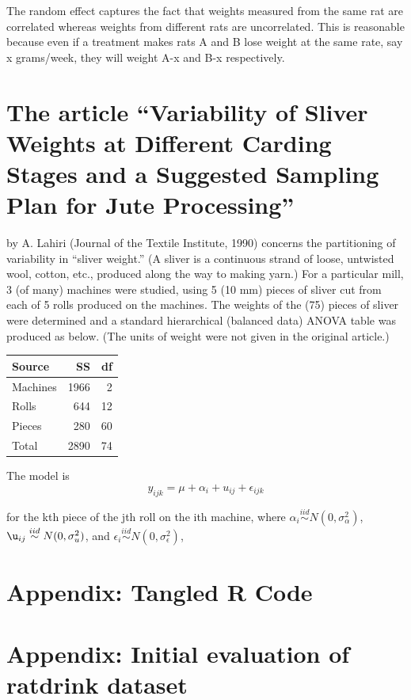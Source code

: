 \documentclass[11pt]{article}
\begin{document}
The random effect captures the fact that weights measured from the
same rat are correlated whereas weights from different rats are
uncorrelated. This is reasonable because even if a treatment makes
rats A and B lose weight at the same rate, say x grams/week, they
will weight A-x and B-x respectively.
\section{The article “Variability of Sliver Weights at Different Carding Stages and a Suggested Sampling Plan for Jute Processing”}
\label{sec-2}

by A. Lahiri (Journal of the Textile Institute, 1990) concerns the 
partitioning
of variability in “sliver weight.” (A sliver is a continuous strand
of loose, untwisted wool, cotton,
etc., produced along the way to making yarn.) For a particular mill, 
3 (of many) machines were
studied, using 5 (10 mm) pieces of sliver cut from each of 5 rolls produced on the machines. The
weights of the (75) pieces of sliver were determined and a standard hierarchical (balanced data)
ANOVA table was produced as below. (The units of weight were not given in the original article.)


\begin{center}
\begin{tabular}{lrr}
 Source    &    SS  &  df  \\
\hline
 Machines  &  1966  &   2  \\
 Rolls     &   644  &  12  \\
 Pieces    &   280  &  60  \\
\hline
 Total     &  2890  &  74  \\
\end{tabular}
\end{center}




The model is $$y_{ijk} = \mu + \alpha_i +u_{ij} + \epsilon_{ijk}$$

for the kth piece of the jth roll on the ith machine, where
$\alpha_i \overset{iid}{\sim} N(0,\sigma^2_\alpha)$,
$\u_{ij} \overset{iid}{\sim} N(0,\sigma^2_u)$, and $\epsilon_i \overset{iid}{\sim} N(0,\sigma^2_\epsilon)$,  
\section{Appendix: Tangled R Code}
\label{sec-3}


 
\section{Appendix: Initial evaluation of ratdrink dataset}
\label{sec-4}
\end{document}
